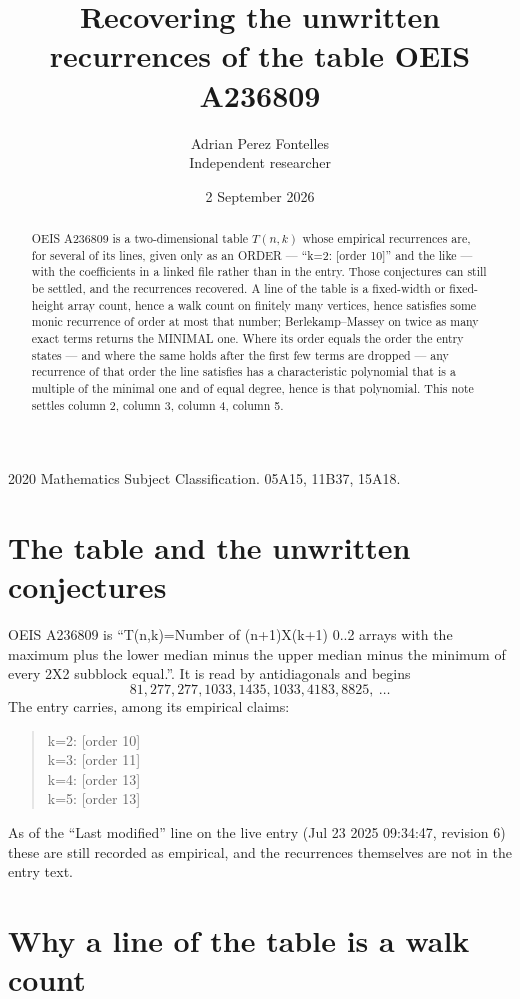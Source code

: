 \documentclass[11pt,a4paper]{article}
\title{Recovering the unwritten recurrences of the table OEIS A236809}
\author{Adrian Perez Fontelles\\ \small Independent researcher}
\date{2 September 2026}
\theoremstyle{plain}
\theoremstyle{definition}
\begin{document}
\maketitle

\begin{abstract}
OEIS A236809 is a two-dimensional table $T(n,k)$ whose empirical recurrences are, for several of
its lines, given only as an ORDER --- ``k=2: [order 10]'' and the like --- with the
coefficients in a linked file rather than in the entry. Those conjectures can still be settled,
and the recurrences recovered. A line of the table is a fixed-width or fixed-height array
count, hence a walk count on finitely many vertices, hence satisfies some monic recurrence of
order at most that number; Berlekamp--Massey on twice as many exact terms returns the MINIMAL
one. Where its order equals the order the entry states --- and where the same holds after the
first few terms are dropped --- any recurrence of that order the line satisfies has a
characteristic polynomial that is a multiple of the minimal one and of equal degree, hence is
that polynomial. This note settles column 2, column 3, column 4, column 5.
\end{abstract}

\noindent\small 2020 Mathematics Subject Classification. 05A15, 11B37, 15A18.\normalsize

\section{The table and the unwritten conjectures}

OEIS A236809 is ``T(n,k)=Number of (n+1)X(k+1) 0..2 arrays with the maximum plus the lower median minus the upper median minus the minimum of every 2X2 subblock equal.''. It is read by antidiagonals and begins
\[
81, 277, 277, 1033, 1435, 1033, 4183, 8825,\ \dots
\]
The entry carries, among its empirical claims:
\begin{quote}\small
k=2: [order 10]\\
k=3: [order 11]\\
k=4: [order 13]\\
k=5: [order 13]
\end{quote}
As of the ``Last modified'' line on the live entry (Jul 23 2025 09:34:47, revision 6) these are still
recorded as empirical, and the recurrences themselves are not in the entry text.

\section{Why a line of the table is a walk count}
\end{document}
